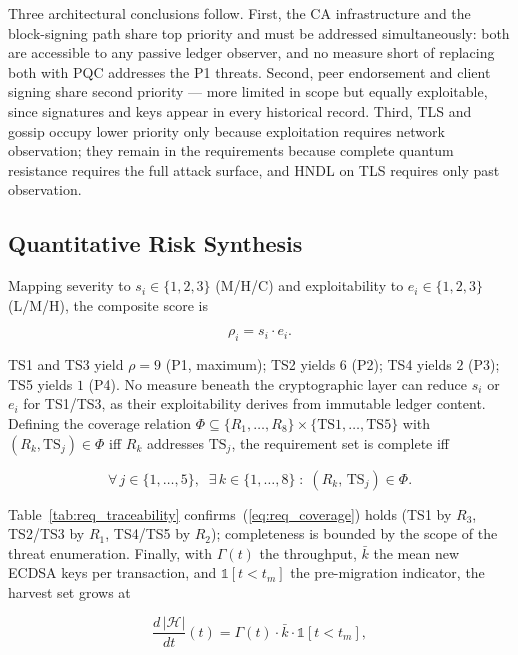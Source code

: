 \documentclass[conference]{IEEEtran}
\begin{document}
Three architectural conclusions follow. First, the CA infrastructure and the
block-signing path share top priority and must be addressed simultaneously: both
are accessible to any passive ledger observer, and no measure short of replacing
both with PQC addresses the P1 threats. Second, peer endorsement and client
signing share second priority --- more limited in scope but equally exploitable,
since signatures and keys appear in every historical record. Third, TLS and gossip
occupy lower priority only because exploitation requires network observation; they
remain in the requirements because complete quantum resistance requires the full
attack surface, and HNDL on TLS requires only past observation.

\subsection{Quantitative Risk Synthesis}
\label{sec:tm_risk_quant}

Mapping severity to $s_i \in \{1,2,3\}$ (M/H/C) and exploitability to
$e_i \in \{1,2,3\}$ (L/M/H), the composite score is

\begin{equation}
\rho_i = s_i \cdot e_i.
\label{eq:risk_score}
\end{equation}

TS1 and TS3 yield $\rho = 9$ (P1, maximum); TS2 yields $6$ (P2); TS4 yields $2$
(P3); TS5 yields $1$ (P4). No measure beneath the cryptographic layer can reduce
$s_i$ or $e_i$ for TS1/TS3, as their exploitability derives from immutable ledger
content. Defining the coverage relation
$\Phi \subseteq \{R_1,\ldots,R_8\}\times\{\mathrm{TS1},\ldots,\mathrm{TS5}\}$
with $(R_k,\mathrm{TS}_j)\in\Phi$ iff $R_k$ addresses $\mathrm{TS}_j$, the
requirement set is complete iff

\begin{equation}
\forall\, j \in \{1,\ldots,5\},\;\;
\exists\, k \in \{1,\ldots,8\} \;:\; (R_k,\,\mathrm{TS}_j) \in \Phi.
\label{eq:req_coverage}
\end{equation}

Table~\ref{tab:req_traceability} confirms~(\ref{eq:req_coverage}) holds (TS1 by
$R_3$, TS2/TS3 by $R_1$, TS4/TS5 by $R_2$); completeness is bounded by the scope
of the threat enumeration. Finally, with $\Gamma(t)$ the throughput, $\bar{k}$
the mean new ECDSA keys per transaction, and $\mathbb{1}[t<t_m]$ the
pre-migration indicator, the harvest set grows at

\begin{equation}
\frac{d\,|\mathcal{H}|}{dt}(t) = \Gamma(t)\cdot\bar{k}\cdot\mathbb{1}[t<t_m],
\label{eq:hndl_rate}
\end{equation}
\end{document}
